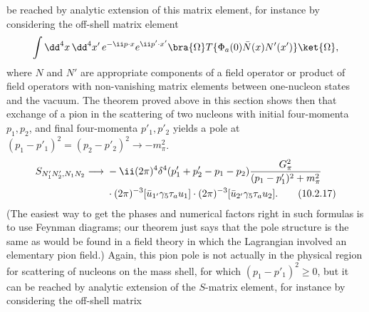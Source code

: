 be reached by analytic extension of this matrix element, for instance by
considering the off-shell matrix element
\[
  \int \dd^4x\,\dd^4x'\,e^{-\ii p\cdot x}e^{\ii p'\cdot x'}
  \bra{\Omega}T\{\Phi_a(0)\bar N(x)N'(x')\}\ket{\Omega},
\]
where $N$ and $N'$ are appropriate components of a field operator or
product of field operators with non-vanishing matrix elements between
one-nucleon states and the vacuum. The theorem proved above in this
section shows then that exchange of a pion in the scattering of two
nucleons with initial four-momenta $p_1,p_2$, and final four-momenta $p'_1,p'_2$
yields a pole at $(p_1-p'_1)^2=(p_2-p'_2)^2\to-m_\pi^2$.
\begin{align}
  S_{N'_1N'_2,N_1N_2}\longrightarrow{}&
  -\ii(2\pi)^4\delta^4(p'_1+p'_2-p_1-p_2)
  \frac{G_\pi^2}{(p_1-p'_1)^2+m_\pi^2}
  \notag\\
  &\cdot(2\pi)^{-3}[\bar u_{1'}\gamma_5\tau_a u_1]
  \cdot(2\pi)^{-3}[\bar u_{2'}\gamma_5\tau_a u_2].
  \tag{10.2.17}\label{eq:10.2.17}
\end{align}
(The easiest way to get the phases and numerical factors right in such
formulas is to use Feynman diagrams; our theorem just says that the pole
structure is the same as would be found in a field theory in which the
Lagrangian involved an elementary pion field.) Again, this pion pole is
not actually in the physical region for scattering of nucleons on the mass
shell, for which $(p_1-p'_1)^2\geq0$, but it can be reached by analytic extension
of the $S$-matrix element, for instance by considering the off-shell matrix

